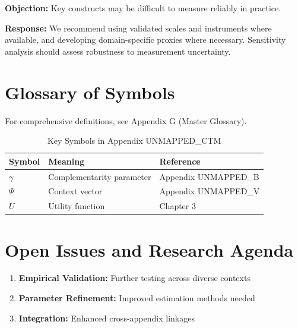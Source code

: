 \textbf{Objection:} Key constructs may be difficult to measure reliably in
practice.

\textbf{Response:} We recommend using validated scales and instruments where
available, and developing domain-specific proxies where necessary. Sensitivity
analysis should assess robustness to measurement uncertainty.



\section{Glossary of Symbols}
\label{sec:ctm-glossary}

For comprehensive definitions, see Appendix G (Master Glossary).

\begin{table}[htbp]
\centering
\caption{Key Symbols in Appendix UNMAPPED_CTM}
\begin{tabular}{lll}
\toprule
\textbf{Symbol} & \textbf{Meaning} & \textbf{Reference} \\
\midrule
$\gamma$ & Complementarity parameter & Appendix UNMAPPED_B \\
$\Psi$ & Context vector & Appendix UNMAPPED_V \\
$U$ & Utility function & Chapter 3 \\
\bottomrule
\end{tabular}
\end{table}



\section{Open Issues and Research Agenda}
\label{sec:ctm-open}

\begin{enumerate}
    \item \textbf{Empirical Validation:} Further testing across diverse contexts
    \item \textbf{Parameter Refinement:} Improved estimation methods needed
    \item \textbf{Integration:} Enhanced cross-appendix linkages
\end{enumerate}

